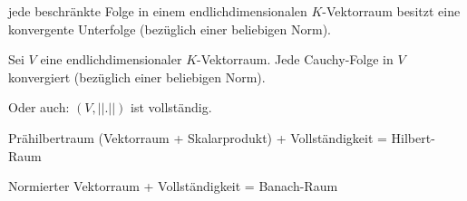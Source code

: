 \documentclass[main.tex]{subfiles}
\begin{document}
\begin{Korollar}
  jede beschränkte Folge in einem endlichdimensionalen $K$-Vektorraum besitzt eine konvergente Unterfolge (bezüglich einer beliebigen Norm).
\end{Korollar}

\begin{Korollar}
  Sei $V$ eine endlichdimensionaler $K$-Vektorraum. Jede Cauchy-Folge in $V$ konvergiert (bezüglich einer beliebigen Norm).

  Oder auch: $(V,||.||)$ ist vollständig.
\end{Korollar}

\begin{Bemerkung}
  Prähilbertraum (Vektorraum + Skalarprodukt) + Vollständigkeit = Hilbert-Raum


  Normierter Vektorraum + Vollständigkeit = Banach-Raum
\end{Bemerkung}
\end{document}
